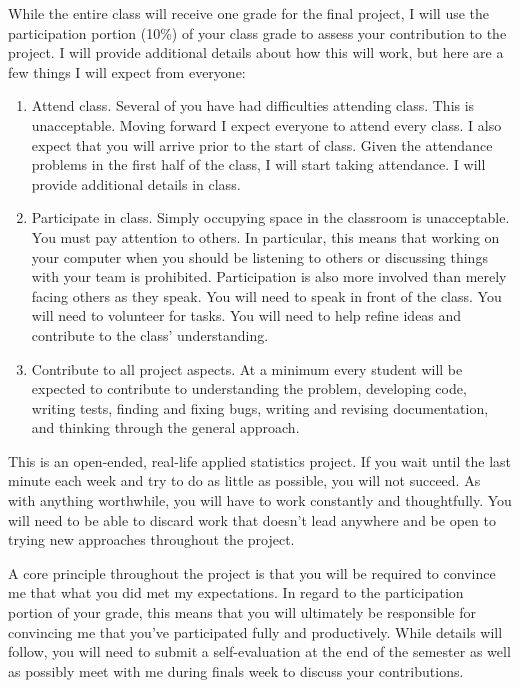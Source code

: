 \documentclass[11pt, oneside]{article}   	%
\begin{document}
While the entire class will receive one grade for the final project, I will use
the participation portion (10\%) of your class grade to assess your
contribution to the project.  I will provide additional details about how this
will work, but here are a few things I will expect from everyone:

\begin{enumerate}
\item Attend class.  Several of you have had difficulties attending class.
  This is unacceptable.  Moving forward I expect everyone to attend every
  class.  I also expect that you will arrive prior to the start of class.
  Given the attendance problems in the first half of the class, I will
  start taking attendance.  I will provide additional details in class.
\item Participate in class.  Simply occupying space in the classroom is
  unacceptable.  You must pay attention to others.  In particular, this
  means that working on your computer when you should be listening to
  others or discussing things with your team is prohibited.  Participation
  is also more involved than merely facing others as they speak.  You will need
  to speak in front of the class.  You will need to volunteer for tasks.
  You will need to help refine ideas and contribute to the class' understanding. 
\item Contribute to all project aspects.  At a minimum every student will
  be expected to contribute to understanding the problem, developing code,
  writing tests, finding and fixing bugs, writing and revising documentation, and
  thinking through the general approach.
\end{enumerate}

This is an open-ended, real-life applied statistics project.  If you wait until
the last minute each week and try to do as little as possible, you will not
succeed.  As with anything worthwhile, you will have to work constantly and
thoughtfully.  You will need to be able to discard work that doesn't lead
anywhere and be open to trying new approaches throughout the project.

A core principle throughout the project is that you will be required to
convince me that what you did met my expectations.  In regard to the
participation portion of your grade, this means that you will ultimately be
responsible for convincing me that you've participated fully and productively.
While details will follow, you will need to submit a self-evaluation at the end
of the semester as well as possibly meet with me during finals week to discuss
your contributions.
\end{document}
